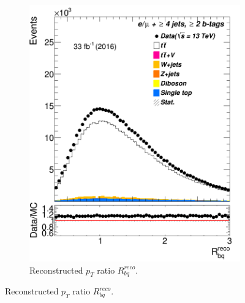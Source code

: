 \begin{figure}
\begin{subfigure}{0.25\textwidth}
		\includegraphics[width=\linewidth]{ControlPlots_emujets_2016_4incl_2incl/klf_window_rbq_reco_emujets_2016.png}
		\caption{Reconstructed $p_T$ ratio $R_{bq}^{reco}$.} \label{fig:K5}
	\end{subfigure}





\end{figure}
